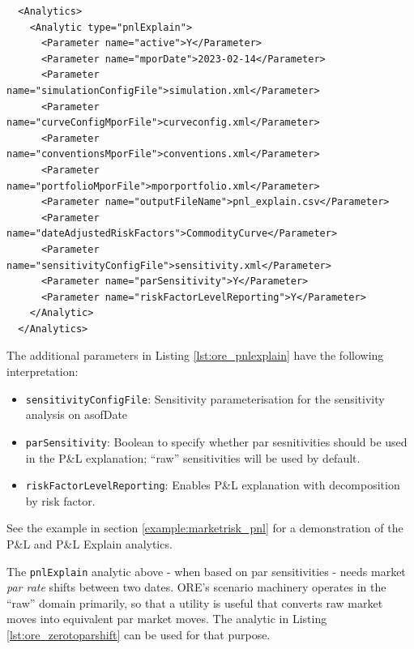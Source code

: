 \begin{listing}[H]
\begin{verbatim}
  <Analytics>
    <Analytic type="pnlExplain">
      <Parameter name="active">Y</Parameter>
      <Parameter name="mporDate">2023-02-14</Parameter>
      <Parameter name="simulationConfigFile">simulation.xml</Parameter>
      <Parameter name="curveConfigMporFile">curveconfig.xml</Parameter>
      <Parameter name="conventionsMporFile">conventions.xml</Parameter>
      <Parameter name="portfolioMporFile">mporportfolio.xml</Parameter>
      <Parameter name="outputFileName">pnl_explain.csv</Parameter>
      <Parameter name="dateAdjustedRiskFactors">CommodityCurve</Parameter>
      <Parameter name="sensitivityConfigFile">sensitivity.xml</Parameter>
      <Parameter name="parSensitivity">Y</Parameter>
      <Parameter name="riskFactorLevelReporting">Y</Parameter>
    </Analytic>
  </Analytics>
\end{verbatim}
\caption{ORE analytic: P\&L Explain}
\label{lst:ore_pnlexplain}
\end{listing}

The additional parameters in Listing \ref{lst:ore_pnlexplain} have the following interpretation:

\begin{itemize}
\item {\tt sensitivityConfigFile}: Sensitivity parameterisation for the sensitivity analysis on asofDate
\item {\tt parSensitivity}: Boolean to specify whether par sesnitivities should be used in the P\&L explanation; ``raw'' sensitivities will be used by default.
\item {\tt riskFactorLevelReporting}:  Enables P\&L explanation with decomposition by risk factor.
\end{itemize}

See the example in section \ref{example:marketrisk_pnl} for a demonstration of the P\&L and P\&L Explain analytics.

\medskip
The {\tt pnlExplain} analytic above - when based on par sensitivities - needs market {\em par rate}
shifts between two dates. ORE's scenario machinery operates in the ``raw'' domain primarily, so that
a utility is useful that converts raw market moves into equivalent par market moves. The analytic
in Listing \ref{lst:ore_zerotoparshift} can be used for that purpose.

